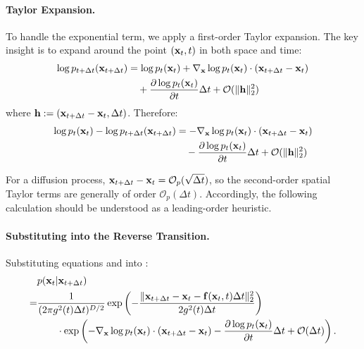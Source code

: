 \paragraph{Taylor Expansion.} 
To handle the exponential term, we apply a first-order Taylor expansion. The key insight is to expand around the point $({\mathbf{x}}_t, t)$ in both space and time:
\begin{align*}
    \log p_{t+\Delta t}({\mathbf{x}}_{t+\Delta t}) &= \log p_t({\mathbf{x}}_t) + \nabla_{{\mathbf{x}}} \log p_t({\mathbf{x}}_t) \cdot ({\mathbf{x}}_{t+\Delta t} - {\mathbf{x}}_t) \nonumber \\
    &\quad + \frac{\partial \log p_t({\mathbf{x}}_t)}{\partial t} \Delta t + \mathcal{O}(\|{\mathbf{h}}\|_2^2) 
\end{align*}
where ${\mathbf{h}} := ({\mathbf{x}}_{t+\Delta t} - {\mathbf{x}}_t, \Delta t)$. Therefore:
\begin{align}
    \log p_t({\mathbf{x}}_t) - \log p_{t+\Delta t}({\mathbf{x}}_{t+\Delta t}) &= -\nabla_{{\mathbf{x}}} \log p_t({\mathbf{x}}_t) \cdot ({\mathbf{x}}_{t+\Delta t} - {\mathbf{x}}_t) \nonumber \\
    &\quad - \frac{\partial \log p_t({\mathbf{x}}_t)}{\partial t} \Delta t + \mathcal{O}(\|{\mathbf{h}}\|_2^2) \label{eq:log-difference}
\end{align}

For a diffusion process,
${\mathbf{x}}_{t+\Delta t}-{\mathbf{x}}_t=\mathcal O_p(\sqrt{\Delta t})$, so the
second-order spatial Taylor terms are generally of order
$\mathcal O_p(\Delta t)$. Accordingly, the following calculation should be
understood as a leading-order heuristic.

\paragraph{Substituting into the Reverse Transition.}
Substituting equations  and  into :
\begin{align*}
    &p({\mathbf{x}}_t | {\mathbf{x}}_{t+\Delta t}) \nonumber \\
    = &\frac{1}{(2\pi g^2(t) \Delta t)^{D/2}} \exp\left(-\frac{\|{\mathbf{x}}_{t+\Delta t} - {\mathbf{x}}_t - {\mathbf{f}}({\mathbf{x}}_t, t) \Delta t\|_2^2}{2 g^2(t) \Delta t}\right) \nonumber \\
    &\qquad \cdot \exp\left(-\nabla_{{\mathbf{x}}} \log p_t({\mathbf{x}}_t) \cdot ({\mathbf{x}}_{t+\Delta t} - {\mathbf{x}}_t) - \frac{\partial \log p_t({\mathbf{x}}_t)}{\partial t} \Delta t +\mathcal{O}(\Delta t)\right). 
\end{align*}
